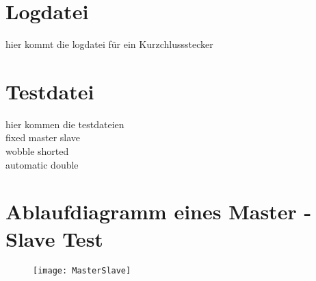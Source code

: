 \newpage
\section{Logdatei}\label{LogDatei}
hier kommt die logdatei für ein Kurzchlussstecker


\newpage
\section{Testdatei}\label{TestDatei}
hier kommen die testdateien\\
fixed master slave\\
wobble shorted\\
automatic double


\newpage
\section{Ablaufdiagramm eines Master - Slave Test}\label{MasterSlaveDiagramm}

\begin{figure}[htbp]
	\texttt{[image: MasterSlave]}  
\end{figure}